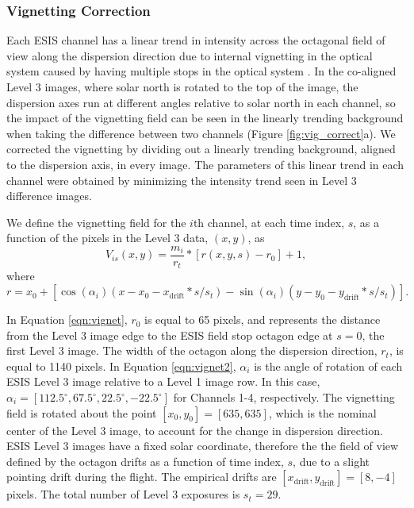\subsubsection{Vignetting Correction}
  
Each ESIS channel has a linear trend in intensity across the octagonal field of view along the dispersion direction due to internal vignetting in the optical system caused by having multiple stops in the optical system \citep{ESIS}.
In the co-aligned Level 3 images, where solar north is rotated to the top of the image, the dispersion axes run at different angles relative to solar north in each channel, so the impact of the vignetting field can be seen in the linearly trending background when taking the difference between two channels (Figure \ref{fig:vig_correct}a).
We corrected the vignetting by dividing out a linearly trending background, aligned to the dispersion axis, in every image. The parameters of this linear trend in each channel were obtained by minimizing the intensity trend seen in Level 3 difference images.

We define the vignetting field for the $i$th channel, at each time index, $s$, as a function of the pixels in the Level 3 data, $(x,y)$, as 
	\begin{equation}
		V_{is}(x,y) = \frac{m_i}{r_t} * [r(x,y,s) - r_0] + 1,
		\label{eqn:vignet}
	\end{equation}
where
	\begin{equation}
		r = x_0 + [\cos(\alpha_i)(x-x_0-x_{\text{drift}}*s/s_t) - \sin(\alpha_i)(y-y_0-y_{\text{drift}}*s/s_t)].
		\label{eqn:vignet2}
	\end{equation}

In Equation \ref{eqn:vignet}, $r_0$ is equal to 65 pixels, and represents the distance from the Level 3 image edge to the ESIS field stop octagon edge at $s = 0$, the first Level 3 image.
The width of the octagon along the dispersion direction, $r_t$, is equal to 1140 pixels.
In Equation \ref{eqn:vignet2},  $\alpha_i$ is the angle of rotation of each ESIS Level 3 image relative to a Level 1 image row.
In this case, $\alpha_i = [112.5^{\circ}, 67.5^{\circ}, 22.5^{\circ}, -22.5^{\circ}]$ for Channels 1-4, respectively.
The vignetting field is rotated about the point $[x_0, y_0] = [635,635]$, which is the nominal center of the Level 3 image, to account for the change in dispersion direction.
ESIS Level 3 images have a fixed solar coordinate, therefore the the field of view defined by the octagon drifts as a function of time index, $s$, due to a slight pointing drift during the flight. 
The empirical drifts are $[x_{\text{drift}},y_{\text{drift}}] = [8, -4]$ pixels. 
The total number of Level 3 exposures is $s_t=29$. 



